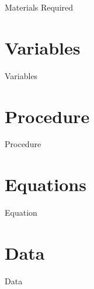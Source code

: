 \documentclass[12pt, a4paper]{article}
\begin{document}
        {Materials Required}
        
\section{{Variables}}
        
        {Variables}
        
\section{{Procedure}}
        
        {Procedure}

        
        
        
\section{{Equations}}
        
        {Equation}

\section{{Data}}

	  {Data}      
        
        
        
        
        
        
\end{document}
